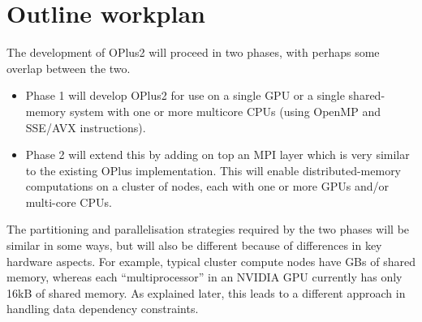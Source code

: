 \documentclass[12pt]{article}
\begin{document}
\newpage

\section{Outline workplan}

The development of OPlus2 will proceed in two phases, with perhaps some 
overlap between the two.
\begin{itemize}
\item
Phase 1 will develop OPlus2 for use on a single GPU or a single 
shared-memory system with one or more multicore CPUs (using OpenMP and 
SSE/AVX instructions).
\item
Phase 2 will extend this by adding on top an MPI layer which is very
similar to the existing OPlus implementation.  This will enable
distributed-memory computations on a cluster of nodes, each with 
one or more GPUs and/or multi-core CPUs.
\end{itemize}

The partitioning and parallelisation strategies required by the two
phases will be similar in some ways, but will also be different because
of differences in key hardware aspects.  For example, typical cluster
compute nodes have GBs of shared memory, whereas each ``multiprocessor'' 
in an NVIDIA GPU currently has only 16kB of shared memory.  As explained 
later, this leads to a different approach in handling data dependency 
constraints.
\end{document}
